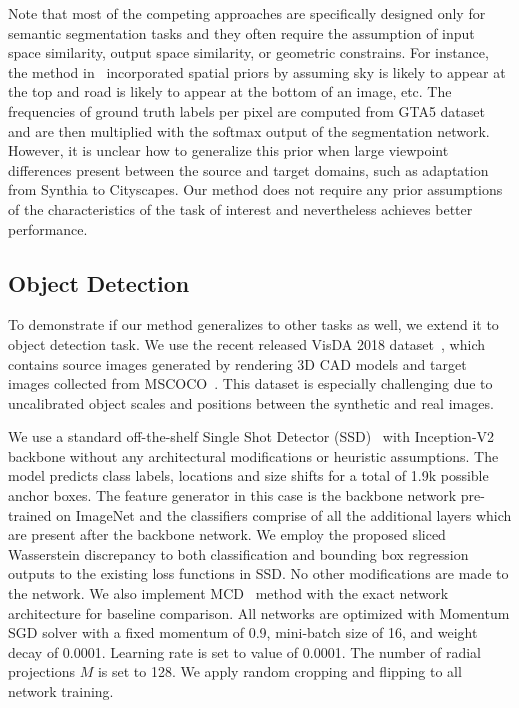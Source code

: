 \documentclass[10pt,twocolumn,letterpaper]{article}
\begin{document}
Note that most of the competing approaches are specifically designed only for semantic segmentation tasks and they often require the assumption of input space similarity, output space similarity, or geometric constrains. For instance, the method in~\cite{zou2018unsupervised} incorporated spatial priors by assuming sky is likely to appear at the top and road is likely to appear at the bottom of an image, etc. The frequencies of ground truth labels per pixel are computed from GTA5 dataset and are then multiplied with the softmax output of the segmentation network. However, it is unclear how to generalize this prior when large viewpoint differences present between the source and target domains, such as adaptation from Synthia to Cityscapes. Our method does not require any prior assumptions of the characteristics of the task of interest and nevertheless achieves better performance.


\subsection{Object Detection}
To demonstrate if our method generalizes to other tasks as well, we extend it to object detection task. We use the recent released VisDA 2018 dataset~\cite{peng2018syn2real}, which contains source images generated by rendering 3D CAD models and target images collected from MSCOCO~\cite{lin2014microsoft}. This dataset is especially challenging due to uncalibrated object scales and positions between the synthetic and real images.

We use a standard off-the-shelf Single Shot Detector (SSD)~\cite{liu2016ssd} with Inception-V2~\cite{szegedy2016rethinking} backbone without any architectural modifications or heuristic assumptions. The model predicts class labels, locations and size shifts for a total of 1.9k possible anchor boxes. The feature generator in this case is the backbone network pre-trained on ImageNet and the classifiers comprise of all the additional layers which are present after the backbone network. We employ the proposed sliced Wasserstein discrepancy to both classification and bounding box regression outputs to the existing loss functions in SSD. No other modifications are made to the network. We also implement MCD~\cite{saito2017maximum} method with the exact network architecture for baseline comparison. All networks are optimized with Momentum SGD solver with a fixed momentum of 0.9, mini-batch size of 16, and weight decay of 0.0001. Learning rate is set to value of 0.0001. The number of radial projections $M$ is set to 128. We apply random cropping and flipping to all network training.
\end{document}
